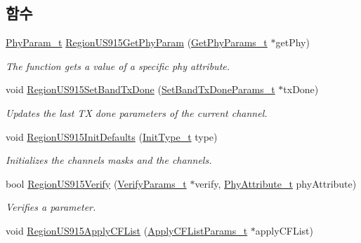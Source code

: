 \subsection*{함수}
\begin{DoxyCompactItemize}
\item 
\mbox{\hyperlink{group___r_e_g_i_o_n_gaed159b26e5c4677236b6e8677019db30}{Phy\+Param\+\_\+t}} \mbox{\hyperlink{group___r_e_g_i_o_n_u_s915_ga644569c2f1367a399ff93a81f160a7d9}{Region\+U\+S915\+Get\+Phy\+Param}} (\mbox{\hyperlink{group___r_e_g_i_o_n_gab471483fff904f4f89bbc03f7fc380ab}{Get\+Phy\+Params\+\_\+t}} $\ast$get\+Phy)
\begin{DoxyCompactList}\small\item\em The function gets a value of a specific phy attribute. \end{DoxyCompactList}\item 
void \mbox{\hyperlink{group___r_e_g_i_o_n_u_s915_ga821c323447c6cadc64cd2d25725782c0}{Region\+U\+S915\+Set\+Band\+Tx\+Done}} (\mbox{\hyperlink{group___r_e_g_i_o_n_gad0524aa0673c0814a71e7a4f9cade3fc}{Set\+Band\+Tx\+Done\+Params\+\_\+t}} $\ast$tx\+Done)
\begin{DoxyCompactList}\small\item\em Updates the last TX done parameters of the current channel. \end{DoxyCompactList}\item 
void \mbox{\hyperlink{group___r_e_g_i_o_n_u_s915_ga099942705729797728a84270350aac78}{Region\+U\+S915\+Init\+Defaults}} (\mbox{\hyperlink{group___r_e_g_i_o_n_gaddc73ae10673ec925724e7870363bda9}{Init\+Type\+\_\+t}} type)
\begin{DoxyCompactList}\small\item\em Initializes the channels masks and the channels. \end{DoxyCompactList}\item 
bool \mbox{\hyperlink{group___r_e_g_i_o_n_u_s915_ga2c010d2640341d3e0690d91ac66bc921}{Region\+U\+S915\+Verify}} (\mbox{\hyperlink{group___r_e_g_i_o_n_ga966d97bc2f25df1c09e92e60ef652276}{Verify\+Params\+\_\+t}} $\ast$verify, \mbox{\hyperlink{group___r_e_g_i_o_n_ga9445b07fdf77581ecfaf389970e635f8}{Phy\+Attribute\+\_\+t}} phy\+Attribute)
\begin{DoxyCompactList}\small\item\em Verifies a parameter. \end{DoxyCompactList}\item 
void \mbox{\hyperlink{group___r_e_g_i_o_n_u_s915_ga072949ee3a416e1bfbe2b3a2c478b13b}{Region\+U\+S915\+Apply\+C\+F\+List}} (\mbox{\hyperlink{group___r_e_g_i_o_n_ga71588e9ad07e34b78fa91d51881fd3c6}{Apply\+C\+F\+List\+Params\+\_\+t}} $\ast$apply\+C\+F\+List)

\end{DoxyCompactItemize}
